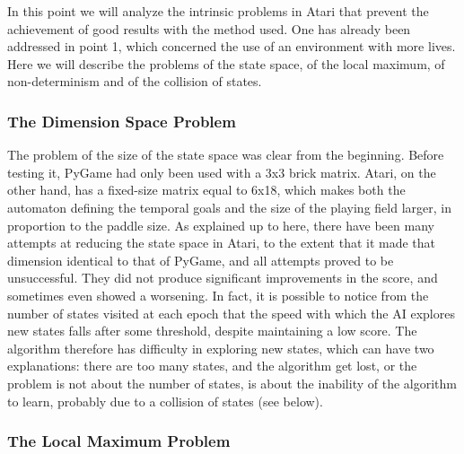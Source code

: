 In this point we will analyze the intrinsic problems in Atari that prevent the achievement of good results with the method used. One has already been addressed in point 1, which concerned the use of an environment with more lives. Here we will describe the problems of the state space, of the local maximum, of non-determinism and of the collision of states.

\subsubsection{The Dimension Space Problem}

The problem of the size of the state space was clear from the beginning. Before testing it, PyGame had only been used with a 3x3 brick matrix. Atari, on the other hand, has a fixed-size matrix equal to 6x18, which makes both the automaton defining the temporal goals and the size of the playing field larger, in proportion to the paddle size. As explained up to here, there have been many attempts at reducing the state space in Atari, to the extent that it made that dimension identical to that of PyGame, and all attempts proved to be unsuccessful. They did not produce significant improvements in the score, and sometimes even showed a worsening. In fact, it is possible to notice from the number of states visited at each epoch that the speed with which the AI explores new states falls after some threshold, despite maintaining a low score. The algorithm therefore has difficulty in exploring new states, which can have two explanations: there are too many states, and the algorithm get lost, or the problem is not about the number of states, is about the inability of the algorithm to learn, probably due to a collision of states (see below).

\subsubsection{The Local Maximum Problem}

